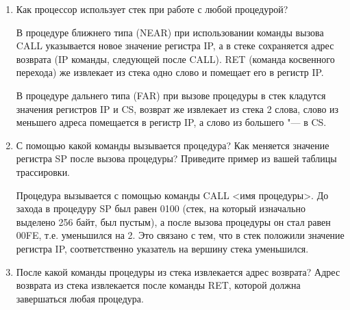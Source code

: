 \documentclass[bachelor, och, otchet]{SCWorks}
\begin{document}
\begin{enumerate}
\item Как процессор использует стек при работе с любой процедурой?

В процедуре ближнего типа (NEAR) при использовании команды вызова CALL указывается новое значение регистра IP, а в стеке сохраняется адрес возврата (IP команды, следующей после CALL). RET (команда косвенного перехода) же извлекает из стека одно слово и помещает его в регистр IP.

В процедуре дальнего типа (FAR) при вызове процедуры в стек кладутся значения регистров IP и CS, возврат же извлекает из стека 2 слова, слово из меньшего адреса помещается в регистр IP, а слово из большего "--- в CS.

\item С помощью какой команды вызывается процедура? Как меняется значение регистра SP после вызова процедуры? Приведите пример из вашей таблицы трассировки.

Процедура вызывается с помощью команды CALL <имя процедуры>. До захода в процедуру SP был равен 0100 (стек, на который изначально выделено 256 байт, был пустым), а после вызова процедуры он стал равен 00FE, т.е. уменьшился на 2. Это связано с тем, что в стек положили значение регистра IP, соответственно указатель на вершину стека уменьшился.

\item После какой команды процедуры из стека извлекается адрес возврата?
Адрес возврата из стека извлекается после команды RET, которой должна завершаться любая процедура.

\end{enumerate}

\appendix
\end{document}
